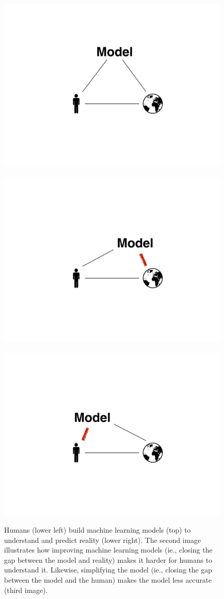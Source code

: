 \begin{figure}
\centering
\vphantom{7cm}
\includegraphics[trim={7cm 8cm 7cm 8cm},clip=true,width=0.275\linewidth]{figs/motivation/hmr}
~
\includegraphics[trim={7cm 8cm 7cm 8cm},clip=true,width=0.275\linewidth]{figs/motivation/hmr_complex}
~
\includegraphics[trim={7cm 8cm 7cm 8cm},clip=true,width=0.275\linewidth]{figs/motivation/hmr_interpretable}
\caption{
Humans (lower left) build machine learning models (top) to understand and
predict reality (lower right). The second image illustrates how improving
machine learning models (ie., closing the gap between the model and reality)
makes it harder for humans to understand it. Likewise, simplifying the model
(ie., closing the gap between the model and the human) makes the model less
accurate (third image).
}
\label{figs:motivation_hmr}
\end{figure}